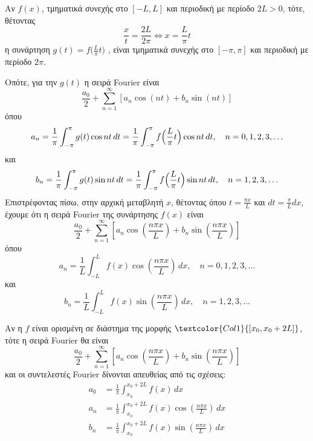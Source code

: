 \documentclass[a4paper,table]{report}
\begin{document}
\begin{rem}
  Αν $ f(x) $, τμηματικά συνεχής στο $ [-L, L] $ και περιοδική  με περίοδο 
  $ 2L>0 $, τότε, θέτοντας 
  \[ 
    \frac{x}{t} = \frac{2L}{2 \pi} \Leftrightarrow \boxed{x= \frac{L}{\pi} t}
  \]
  η συνάρτηση $g(t) = f\bigl(\frac{L}{\pi}t\bigr)$ , είναι τμηματικά συνεχής στο 
  $ [- \pi , \pi] $ και περιοδική με περίοδο $ 2 \pi $.
\end{rem}
Οπότε, για την $ g(t) $ η σειρά \textlatin{Fourier} είναι 
\[
  \frac{a_{0}}{2} + \sum_{n=1}^{\infty} [a_{n} \cos{(nt)} + b_{n} \sin{(nt)}]
\] 
όπου 
\[
  a_{n} = \frac{1}{\pi} \int _{- \pi}^{\pi} g(t) \cos{nt} \,{dt} = 
  \frac{1}{\pi} \int _{- \pi}^{\pi} f\Bigl(\frac{L}{\pi} t\Bigr) \cos{nt} \,{dt}, 
  \quad n = 0,1,2,3, \ldots
\] 
και 
\[
  b_{n} = \frac{1}{\pi} \int _{- \pi}^{\pi} g(t) \sin{nt} \,{dt} = 
  \frac{1}{\pi} \int _{- \pi}^{\pi} f\Bigl(\frac{L}{\pi} t\Bigr) \sin{nt} \,{dt}, 
  \quad n = 1,2,3, \ldots
\]
Επιστρέφοντας πίσω, στην αρχική μεταβλητή $x$, θέτοντας όπου $ t = \frac{\pi x}{L} $ 
και $ dt = \frac{\pi}{L} dx $, έχουμε ότι η σειρά \textlatin{Fourier} της συνάρτησης $ f(x) $ είναι
\[
  \boxed{\frac{a_{0}}{2} + \sum_{n=1}^{\infty} \left[a_{n} 
      \cos{\left(\frac{n \pi x}{L}\right)} + b_{n} 
  \sin{\left(\frac{n \pi x}{L}\right)} \right]}
\]
όπου 
\[
  a_{n} = \frac{1}{L} \int _{- L}^{L} f(x) 
  \cos{\left(\frac{n \pi x}{L}\right)} \,{dx}, \quad n = 0,1,2,3, \ldots
\] 
και 
\[
  b_{n} = \frac{1}{L} \int _{- L}^{L} f(x) 
  \sin{\left(\frac{n \pi x}{L}\right)} \,{dx}, \quad n = 1,2,3, \ldots
\]

\begin{rem}
  Αν η $f$ είναι ορισμένη σε διάστημα της μορφής 
  $\textcolor{Col1}{[x_{0}, x_{0}+2L]} $, τότε η σειρά \textlatin{Fourier} θα είναι 
  \[
    \frac{a_{0}}{2} + \sum_{n=1}^{\infty} \left[a_{n} 
      \cos{\left(\frac{n \pi x}{L}\right)} + b_{n} 
    \sin{\left(\frac{n \pi x}{L}\right)} \right]
  \]
  και οι συντελεστές \textlatin{Fourier} δίνονται απευθείας από τις σχέσεις:
  \begin{align*}
    a_{0} &= \frac{1}{\pi} \int _{x_{0}}^{x_{0}+ 2 L}f(x) \,{dx} \\
    a_{n} &= \frac{1}{\pi} \int _{x_{0}}^{x_{0}+ 2 L} f(x) \cos{\left(\frac{n \pi x}{L}\right)} \,{dx}  \\
    b_{n} &= \frac{1}{\pi} \int _{x_{0}}^{x_{0}+ 2 L} f(x) \sin{\left(\frac{n \pi x}{L}\right)} \,{dx}  
  \end{align*} 
\end{rem}
\end{document}
